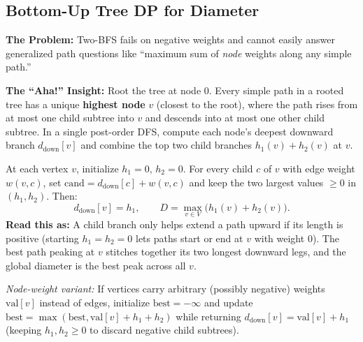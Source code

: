 \documentclass[11pt,a4paper]{article}
\theoremstyle{definition}
\newcommand{\painbeat}{\textbf{\color{accentamber}The Problem:} }
\newcommand{\ahabeat}{\textbf{\color{accentteal}The ``Aha!'' Insight:} }
\begin{document}
\subsection{Bottom-Up Tree DP for Diameter}

\painbeat Two-BFS fails on negative weights and cannot easily answer generalized path questions like ``maximum sum of \emph{node} weights along any simple path.''

\ahabeat Root the tree at node $0$. Every simple path in a rooted tree has a unique \textbf{highest node} $v$ (closest to the root), where the path rises from at most one child subtree into $v$ and descends into at most one other child subtree. In a single post-order DFS, compute each node's deepest downward branch $d_{\text{down}}[v]$ and combine the top two child branches $h_1(v) + h_2(v)$ at $v$.

\begin{formulabox}
At each vertex $v$, initialize $h_1 = 0,\, h_2 = 0$. For every child $c$ of $v$ with edge weight $w(v, c)$, set $\text{cand} = d_{\text{down}}[c] + w(v, c)$ and keep the two largest values $\ge 0$ in $(h_1, h_2)$. Then:
$$d_{\text{down}}[v] = h_1, \qquad D = \max_{v \in V}\bigl(h_1(v) + h_2(v)\bigr).$$
\textbf{Read this as:} A child branch only helps extend a path upward if its length is positive (starting $h_1 = h_2 = 0$ lets paths start or end at $v$ with weight $0$). The best path peaking at $v$ stitches together its two longest downward legs, and the global diameter is the best peak across all $v$.
\end{formulabox}

\emph{Node-weight variant:} If vertices carry arbitrary (possibly negative) weights $\text{val}[v]$ instead of edges, initialize $\text{best} = -\infty$ and update $\text{best} = \max(\text{best}, \text{val}[v] + h_1 + h_2)$ while returning $d_{\text{down}}[v] = \text{val}[v] + h_1$ (keeping $h_1, h_2 \ge 0$ to discard negative child subtrees).
\end{document}
